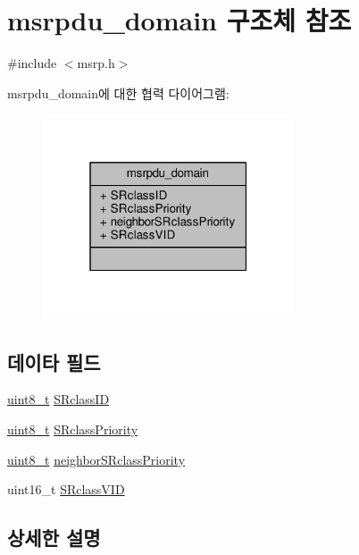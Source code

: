 \hypertarget{structmsrpdu__domain}{}\section{msrpdu\+\_\+domain 구조체 참조}
\label{structmsrpdu__domain}


{\ttfamily \#include $<$msrp.\+h$>$}



msrpdu\+\_\+domain에 대한 협력 다이어그램\+:
\nopagebreak
\begin{figure}[H]
\begin{center}
\leavevmode
\includegraphics[width=211pt]{structmsrpdu__domain__coll__graph}
\end{center}
\end{figure}
\subsection*{데이타 필드}
\begin{DoxyCompactItemize}
\item 
\hyperlink{stdint_8h_aba7bc1797add20fe3efdf37ced1182c5}{uint8\+\_\+t} \hyperlink{structmsrpdu__domain_a93cbc1ec12e4b8c62aa3cafcbe9aa92e}{S\+Rclass\+ID}
\item 
\hyperlink{stdint_8h_aba7bc1797add20fe3efdf37ced1182c5}{uint8\+\_\+t} \hyperlink{structmsrpdu__domain_adcf8b02949ce4e07bd3d61fb4082ab66}{S\+Rclass\+Priority}
\item 
\hyperlink{stdint_8h_aba7bc1797add20fe3efdf37ced1182c5}{uint8\+\_\+t} \hyperlink{structmsrpdu__domain_ae9e61b028a38f302a5888dc230ec3bf2}{neighbor\+S\+Rclass\+Priority}
\item 
uint16\+\_\+t \hyperlink{structmsrpdu__domain_ac3d5ab67ff0aa5f58fa4dc5057d3ad02}{S\+Rclass\+V\+ID}
\end{DoxyCompactItemize}


\subsection{상세한 설명}


